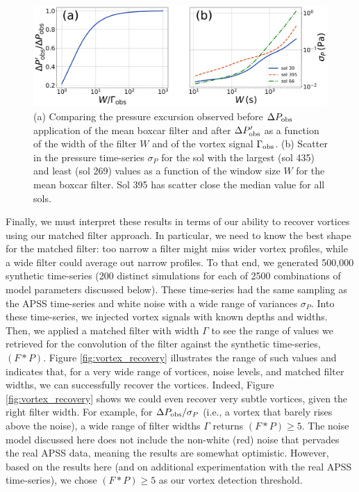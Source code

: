 \documentclass{aastex63}
\begin{document}
\begin{figure}
    \centering
    \includegraphics[width=\textwidth]{figures/Pobsprime-sigmaP_vs_W.png}
    \caption{(a) Comparing the pressure excursion observed before $\Delta P_{\rm obs}$ application of the mean boxcar filter and after $\Delta P_{\rm obs}^\prime$ as a function of the width of the filter $W$ and of the vortex signal $\Gamma_{\rm obs}$. (b) Scatter in the pressure time-series $\sigma_P$ for the sol with the largest (sol 435) and least (sol 269) values as a function of the window size $W$ for the mean boxcar filter. Sol 395 has scatter close the median value for all sols. }
    \label{fig:Pobsprime-sigmaP_vs_W}
\end{figure}

Finally, we must interpret these results in terms of our ability to recover vortices using our matched filter approach. In particular, we need to know the best shape for the matched filter: too narrow a filter might miss wider vortex profiles, while a wide filter could average out narrow profiles. To that end, we generated 500,000 synthetic time-series (200 distinct simulations for each of 2500 combinations of model parameters discussed below). These time-series had the same sampling as the APSS time-series and white noise with a wide range of variances $\sigma_P$. Into these time-series, we injected vortex signals with known depths and widths. Then, we applied a matched filter with width $\Gamma$ to see the range of values we retrieved for the convolution of the filter against the synthetic time-series, $\left( F \ast P \right)$. Figure \ref{fig:vortex_recovery} illustrates the range of such values and indicates that, for a very wide range of vortices, noise levels, and matched filter widths, we can successfully recover the vortices. Indeed, Figure \ref{fig:vortex_recovery} shows we could even recover very subtle vortices, given the right filter width. For example, for $\Delta P_{\rm obs}/\sigma_P$ (i.e., a vortex that barely rises above the noise), a wide range of filter widths $\Gamma$ returns $\left( F \ast P \right) \geq 5 $. The noise model discussed here does not include the non-white (red) noise that pervades the real APSS data, meaning the results are somewhat optimistic. However, based on the results here (and on additional experimentation with the real APSS time-series), we chose $\left( F \ast P \right) \geq 5 $ as our vortex detection threshold. 
\end{document}
